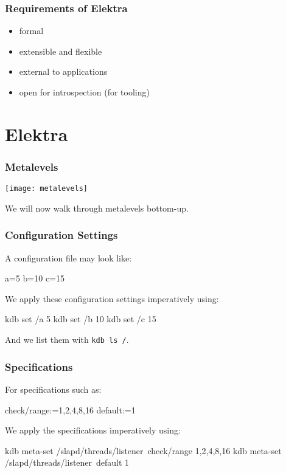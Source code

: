 \begin{frame}
	\frametitle{Requirements of Elektra}

	\begin{itemize}
		\item formal
		\item extensible and flexible
		\item external to applications
		\item open for introspection (for tooling)
	\end{itemize}
\end{frame}

\section{Elektra}

\begin{frame}
	\frametitle{Metalevels}
	\texttt{[image: metalevels]}

	We will now walk through metalevels bottom-up.
\end{frame}

\begin{frame}[fragile]
	\frametitle{Configuration Settings}

	A configuration file may look like:

	\begin{code}[language=CfgElektra]
	a=5
	b=10
	c=15
	\end{code}

	We apply these configuration settings imperatively using:

	\begin{code}[language=bash]
	kdb set /a 5
	kdb set /b 10
	kdb set /c 15
	\end{code}

	And we list them with \lstinline[language=bash,morekeywords={ls},showspaces=no]^kdb ls /^.
\end{frame}

\begin{frame}[fragile]
	\frametitle{Specifications}
	For specifications such as:

	\begin{code}
	  check/range:=1,2,4,8,16
	  default:=1
	\end{code}

	We apply the specifications imperatively using:

	\begin{code}[language=bash,morekeywords={meta-set}]
	kdb meta-set /slapd/threads/listener\
		check/range 1,2,4,8,16
	kdb meta-set /slapd/threads/listener\
		default 1
	\end{code}
\end{frame}

